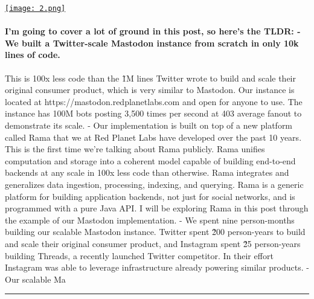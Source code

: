 \documentclass[10pt,a4paper]{article}
\begin{document}
\begin{minipage}[t]{0.80\linewidth}
\vspace{0pt}
\begin{multicols}{2}

    \href{https://blog.redplanetlabs.com/2023/08/15/how-we-reduced-the-cost-of-building-twitter-at-twitter-scale-by-100x/?utm\_source=hackernewsletter\&utm\_medium=email\&utm\_term=fav}{
        \texttt{[image: 2.png]}
    }
  
\paragraph{I’m going to cover a lot of ground in this post, so here’s the TLDR:
- We built a Twitter-scale Mastodon instance from scratch in only 10k lines of code.}
 This is 100x less code than the \~1M lines Twitter wrote to build and scale their original consumer product, which is very similar to Mastodon. Our instance is located at https://mastodon.redplanetlabs.com and open for anyone to use. The instance has 100M bots posting 3,500 times per second at 403 average fanout to demonstrate its scale.
- Our implementation is built on top of a new platform called Rama that we at Red Planet Labs have developed over the past 10 years. This is the first time we’re talking about Rama publicly. Rama unifies computation and storage into a coherent model capable of building end-to-end backends at any scale in 100x less code than otherwise. Rama integrates and generalizes data ingestion, processing, indexing, and querying. Rama is a generic platform for building application backends, not just for social networks, and is programmed with a pure Java API. I will be exploring Rama in this post through the example of our Mastodon implementation.
- We spent nine person-months building our scalable Mastodon instance. Twitter spent \~200 person-years to build and scale their original consumer product, and Instagram spent \~25 person-years building Threads, a recently launched Twitter competitor. In their effort Instagram was able to leverage infrastructure already powering similar products.
- Our scalable Ma

\end{multicols}
\end{minipage}
\par\medskip
\noindent\textcolor{red}{\rule{\linewidth}{0.2mm}}
\end{document}
